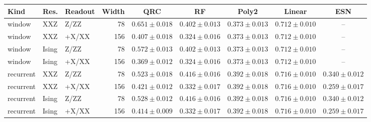 \begin{tabular}{lllrccccc}
\toprule
Kind & Res. & Readout & Width & QRC & RF & Poly2 & Linear & ESN \\
\midrule
window & XXZ & Z/ZZ & 78 & $0.651\pm0.018$ & $0.402\pm0.013$ & $\mathbf{0.373}\pm0.013$ & $0.712\pm0.010$ & -- \\
window & XXZ & +X/XX & 156 & $0.407\pm0.018$ & $\mathbf{0.324}\pm0.016$ & $0.373\pm0.013$ & $0.712\pm0.010$ & -- \\
window & Ising & Z/ZZ & 78 & $0.572\pm0.013$ & $0.402\pm0.013$ & $\mathbf{0.373}\pm0.013$ & $0.712\pm0.010$ & -- \\
window & Ising & +X/XX & 156 & $0.369\pm0.012$ & $\mathbf{0.324}\pm0.016$ & $0.373\pm0.013$ & $0.712\pm0.010$ & -- \\
\midrule
recurrent & XXZ & Z/ZZ & 78 & $0.523\pm0.018$ & $0.416\pm0.016$ & $0.392\pm0.018$ & $0.716\pm0.010$ & $\mathbf{0.340}\pm0.012$ \\
recurrent & XXZ & +X/XX & 156 & $0.421\pm0.012$ & $0.332\pm0.017$ & $0.392\pm0.018$ & $0.716\pm0.010$ & $\mathbf{0.259}\pm0.017$ \\
recurrent & Ising & Z/ZZ & 78 & $0.528\pm0.012$ & $0.416\pm0.016$ & $0.392\pm0.018$ & $0.716\pm0.010$ & $\mathbf{0.340}\pm0.012$ \\
recurrent & Ising & +X/XX & 156 & $0.414\pm0.009$ & $0.332\pm0.017$ & $0.392\pm0.018$ & $0.716\pm0.010$ & $\mathbf{0.259}\pm0.017$ \\
\bottomrule
\end{tabular}
